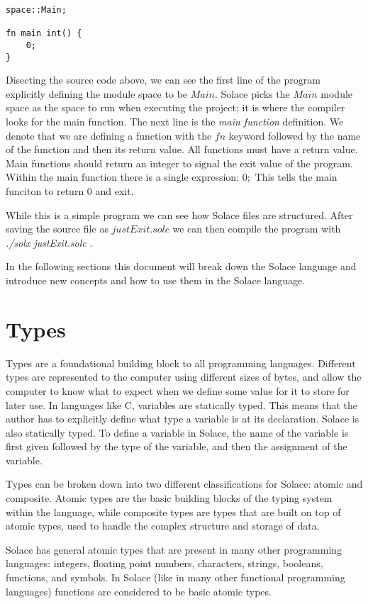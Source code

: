 \documentclass{article}
\begin{document}
\begin{lstlisting}
space::Main;

fn main int() {
	0;
}
\end{lstlisting}

Disecting the source code above, we can see the first line of the program explicitly defining the module space to be $Main$. Solace
picks the $Main$ module space as the space to run when executing the project; it is where the compiler looks for the main function.
The next line is the \textit{main function} definition. We denote that we are defining a function with the $fn$ keyword followed by
the name of the function and then its return value. All functions must have a return value. Main functions should return an integer
to signal the exit value of the program. Within the main function there is a single expression: $0;$ This tells the main funciton
to return $0$ and exit.

While this is a simple program we can see how Solace files are structured. After saving the source file as $justExit.solc$ we can
then compile the program with \textit{./solx justExit.solc} .

In the following sections this document will break down the Solace language and introduce new concepts and how to use them in the
Solace language.


\section{Types}

Types are a foundational building block to all programming languages. Different types are represented to the computer using
different sizes of bytes, and allow the computer to know what to expect when we define some value for it to store for later
use. In languages like C, variables are statically typed. This means that the author has to explicitly define what type a
variable is at its declaration. Solace is also statically typed. To define a variable in Solace, the name of the variable is
first given followed by the type of the variable, and then the assignment of the variable.

Types can be broken down into two different classifications for Solace: atomic and composite. Atomic types are the basic
building blocks of the typing system within the language, while composite types are types that are built on top of atomic
types, used to handle the complex structure and storage of data.

Solace has general atomic types that are present in many other programming languages: integers, floating point numbers, characters,
strings, booleans, functions, and symbols. In Solace (like in many other functional programming languages) functions are considered
to be basic atomic types.
\end{document}
